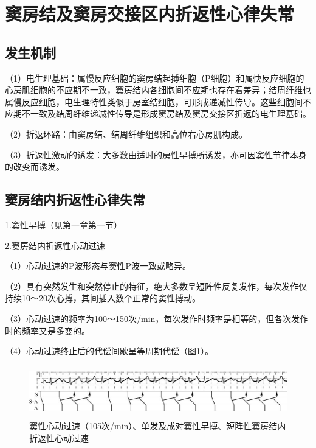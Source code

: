 \section{窦房结及窦房交接区内折返性心律失常}

\protect\hypertarget{text00021.htmlux5cux23subid230}{}{}

\subsection{发生机制}

（1）电生理基础：属慢反应细胞的窦房结起搏细胞（P细胞）和属快反应细胞的心房肌细胞的不应期不一致，窦房结内各细胞间不应期也存在着差异；结周纤维也属慢反应细胞，电生理特性类似于房室结细胞，可形成递减性传导。这些细胞间不应期不一致及结周纤维递减性传导是形成窦房结及窦房交接区折返的电生理基础。

（2）折返环路：由窦房结、结周纤维组织和高位右心房肌构成。

（3）折返性激动的诱发：大多数由适时的房性早搏所诱发，亦可因窦性节律本身的改变而诱发。

\protect\hypertarget{text00021.htmlux5cux23subid231}{}{}

\subsection{窦房结内折返性心律失常}

1.窦性早搏（见第一章第一节）

2.窦房结内折返性心动过速

（1）心动过速的P波形态与窦性P波一致或略异。

（2）具有突然发生和突然停止的特征，绝大多数呈短阵性反复发作，每次发作仅持续10～20次心搏，其间插入数个正常的窦性搏动。

（3）心动过速的频率为100～150次/min，每次发作时频率是相等的，但各次发作时的频率又是多变的。

（4）心动过速终止后的代偿间歇呈等周期代偿（图\ref{fig14-1}）。

\begin{figure}[!htbp]
 \centering
 \includegraphics[width=5.77083in,height=0.88542in]{./images/Image00245.jpg}
 \captionsetup{justification=centering}
 \caption{窦性心动过速（105次/min）、单发及成对窦性早搏、短阵性窦房结内折返性心动过速}
 \label{fig14-1}
  \end{figure} 

